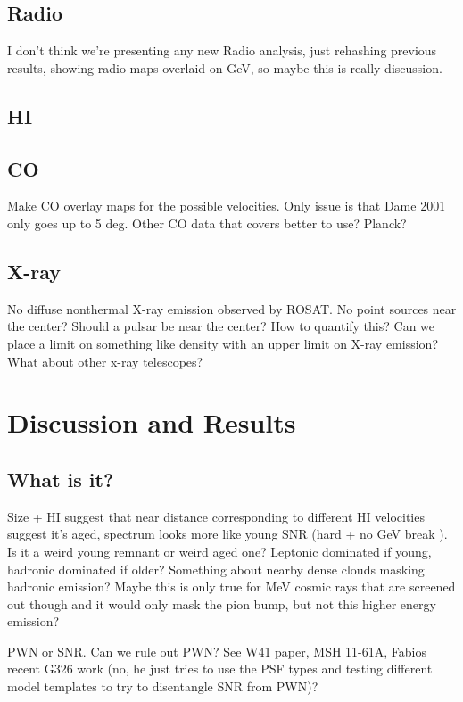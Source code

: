 \documentclass[preprint2]{aastex}
\begin{document}
\subsection{\label{sec:Radio}Radio}
I don't think we're presenting any new Radio analysis, just rehashing previous results, showing radio maps overlaid on GeV, so maybe this is really discussion.
\citep{Gao14}
\subsection{\label{sec:HI}HI}
\subsection{\label{sec:CO}CO}
Make CO overlay maps for the possible velocities. Only issue is that Dame 2001 only goes up to 5 deg. Other CO data that covers better to use? Planck?
\subsection{\label{sec:Xray}X-ray}
No diffuse nonthermal X-ray emission observed by ROSAT. No point sources near the center? Should a pulsar be near the center? How to quantify this? Can we place a limit on something like density with an upper limit on X-ray emission? What about other x-ray telescopes?

%
%
\section{\label{sec:Discuss}Discussion and Results}
\subsection{\label{sec:What}What is it?}
Size + HI suggest that near distance corresponding to different HI velocities suggest it's aged, spectrum looks more like young SNR (hard + no GeV break ). Is it a weird young remnant or weird aged one? Leptonic dominated if young, hadronic dominated if older? Something about nearby dense clouds masking hadronic emission? Maybe this is only true for MeV cosmic rays that are screened out though and it would only mask the pion bump, but not this higher energy emission?

PWN or SNR. Can we rule out PWN? See W41 paper, MSH 11-61A, Fabios recent G326 work (no, he just tries to use the PSF types and testing different model templates to try to disentangle SNR from PWN)?
\end{document}
